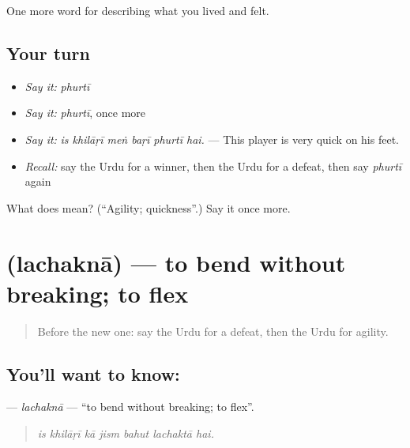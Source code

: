 \begin{grammarlens}[title={What you've built}]
One more word for describing what you lived and felt.
\end{grammarlens}

\subsection*{Your turn}
\begin{itemize}
\raggedright
  \item \emph{Say it:} \emph{phurtī}
  \item \emph{Say it:} \emph{phurtī}, once more
  \item \emph{Say it:} \emph{is khilāṛī meṅ baṛī phurtī hai.} — This player is very quick on his feet.
  \item \emph{Recall:} say the Urdu for a winner, then the Urdu for a defeat, then say \emph{phurtī} again
\end{itemize}

\begin{tcolorbox}[breakable,colback=teal!4,colframe=teal!35!black,title={Before you move on}]
What does  mean? (\textquotedblleft{}Agility; quickness\textquotedblright{}.) Say it once more.
\end{tcolorbox}
\section[\texorpdfstring{\ur{لچکنا} (lachaknā)}{لچکنا (lachaknā)}]{ (lachaknā) — to bend without breaking; to flex}

\label{lesson:UR-C522-lachakna}



\begin{quote}
Before the new one: say the Urdu for a defeat, then the Urdu for agility.
\end{quote}

\subsection*{You'll want to know: }
\textbf{} — \emph{lachaknā} — \textquotedblleft{}to bend without breaking; to flex\textquotedblright{}.

\begin{quote}
      
\end{quote}

\begin{quote}
\emph{is khilāṛī kā jism bahut lachaktā hai.}
\end{quote}

